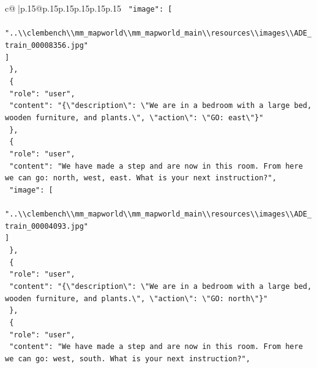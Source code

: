 \documentclass{article}
\begin{document}
{\begin{supertabular}{c@{$\;$}|p{.15\linewidth}@{}p{.15\linewidth}p{.15\linewidth}p{.15\linewidth}p{.15\linewidth}p{.15\linewidth}}
{{{\texttt{    "image": {[}} \\
\texttt{      "..\textbackslash{}\textbackslash{}clembench\textbackslash{}\textbackslash{}mm\_mapworld\textbackslash{}\textbackslash{}mm\_mapworld\_main\textbackslash{}\textbackslash{}resources\textbackslash{}\textbackslash{}images\textbackslash{}\textbackslash{}ADE\_train\_00008356.jpg"} \\
\texttt{    {]}} \\
\texttt{  \},} \\
\texttt{  \{} \\
\texttt{    "role": "user",} \\
\texttt{    "content": "\{\textbackslash{}"description\textbackslash{}": \textbackslash{}"We are in a bedroom with a large bed, wooden furniture, and plants.\textbackslash{}", \textbackslash{}"action\textbackslash{}": \textbackslash{}"GO: east\textbackslash{}"\}"} \\
\texttt{  \},} \\
\texttt{  \{} \\
\texttt{    "role": "user",} \\
\texttt{    "content": "We have made a step and are now in this room. From here we can go: north, west, east. What is your next instruction?",} \\
\texttt{    "image": {[}} \\
\texttt{      "..\textbackslash{}\textbackslash{}clembench\textbackslash{}\textbackslash{}mm\_mapworld\textbackslash{}\textbackslash{}mm\_mapworld\_main\textbackslash{}\textbackslash{}resources\textbackslash{}\textbackslash{}images\textbackslash{}\textbackslash{}ADE\_train\_00004093.jpg"} \\
\texttt{    {]}} \\
\texttt{  \},} \\
\texttt{  \{} \\
\texttt{    "role": "user",} \\
\texttt{    "content": "\{\textbackslash{}"description\textbackslash{}": \textbackslash{}"We are in a bedroom with a large bed, wooden furniture, and plants.\textbackslash{}", \textbackslash{}"action\textbackslash{}": \textbackslash{}"GO: north\textbackslash{}"\}"} \\
\texttt{  \},} \\
\texttt{  \{} \\
\texttt{    "role": "user",} \\
\texttt{    "content": "We have made a step and are now in this room. From here we can go: west, south. What is your next instruction?",} \\
}}}
\end{supertabular}}
\end{document}
